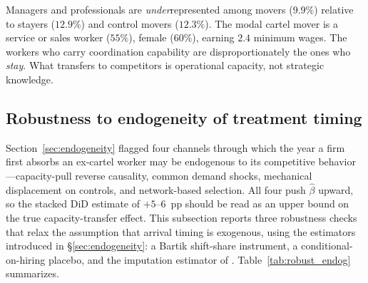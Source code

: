 Managers and professionals are \emph{under}represented among movers ($9.9\%$) relative to stayers ($12.9\%$) and control movers ($12.3\%$). The modal cartel mover is a service or sales worker ($55\%$), female ($60\%$), earning $2.4$ minimum wages. The workers who carry coordination capability are disproportionately the ones who \emph{stay}. What transfers to competitors is operational capacity, not strategic knowledge.

\subsection{Robustness to endogeneity of treatment timing}\label{sec:rob_endog}

Section~\ref{sec:endogeneity} flagged four channels through which the year a firm first absorbs an ex-cartel worker may be endogenous to its competitive behavior---capacity-pull reverse causality, common demand shocks, mechanical displacement on controls, and network-based selection. All four push $\hat\beta$ upward, so the stacked DiD estimate of $+5$--$6$~pp should be read as an upper bound on the true capacity-transfer effect. This subsection reports three robustness checks that relax the assumption that arrival timing is exogenous, using the estimators introduced in \S\ref{sec:endogeneity}: a Bartik shift-share instrument, a conditional-on-hiring placebo, and the imputation estimator of \citet{borusyak2024revisiting}. Table~\ref{tab:robust_endog} summarizes.

